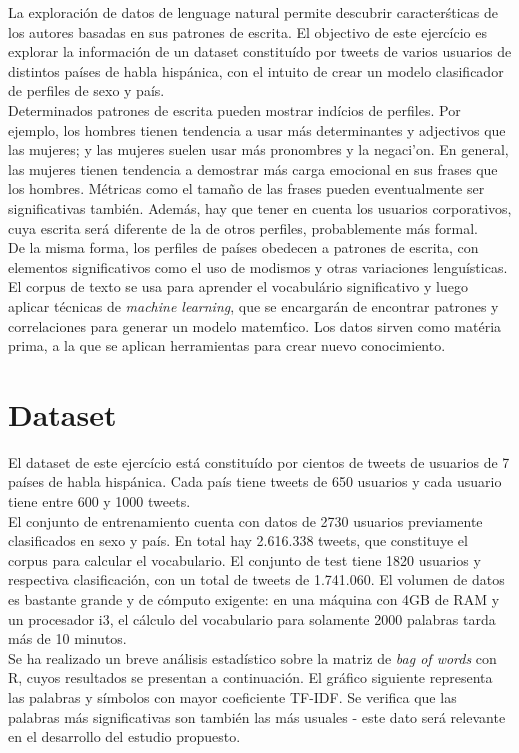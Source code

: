 \documentclass[11pt,a4paper]{article}
\begin{document}
  \indent La exploraci\'on de datos de lenguage natural permite descubrir caracter\'sticas de los autores basadas en sus patrones de escrita. El objectivo de este ejerc\'icio es explorar la informaci\'on de un dataset constitu\'ido por tweets de varios usuarios de distintos pa\'ises de habla hisp\'anica, con el intuito de crear un modelo clasificador de perfiles de sexo y pa\'is.\\
  \indent Determinados patrones de escrita pueden mostrar ind\'icios de perfiles. Por ejemplo, los hombres tienen tendencia a usar m\'as determinantes y adjectivos que las mujeres; y las mujeres suelen usar m\'as pronombres y la negaci'on. En general, las mujeres tienen tendencia a demostrar m\'as carga emocional en sus frases que los hombres. M\'etricas como el tamaño de las frases pueden eventualmente ser significativas tambi\'en. Adem\'as, hay que tener en cuenta los usuarios corporativos, cuya escrita ser\'a diferente de la de otros perfiles, probablemente m\'as formal.\\
  \indent De la misma forma, los perfiles de pa\'ises obedecen a patrones de escrita, con elementos significativos como el uso de modismos y otras variaciones lengu\'isticas. \\
  \indent El corpus de texto se usa para aprender el vocabul\'ario significativo y luego aplicar t\'ecnicas de {\em machine learning}, que se encargar\'an de encontrar patrones y correlaciones para generar un modelo matem\'tico. Los datos sirven como mat\'eria prima, a la que se aplican herramientas para crear nuevo conocimiento.


\section{Dataset}

  \indent El dataset de este ejerc\'icio est\'a constitu\'ido por cientos de tweets de usuarios de 7 pa\'ises de habla hisp\'anica. Cada pa\'is tiene tweets de 650 usuarios y cada usuario tiene entre 600 y 1000 tweets. \\
  \indent El conjunto de entrenamiento cuenta con datos de 2730 usuarios previamente clasificados en sexo y pa\'is. En total hay 2.616.338 tweets, que constituye el corpus para calcular el vocabulario. El conjunto de test tiene 1820 usuarios y respectiva clasificaci\'on, con un total de tweets de 1.741.060. El volumen de datos es bastante grande y de c\'omputo exigente: en una m\'aquina con 4GB de RAM y un procesador i3, el c\'alculo del vocabulario para solamente 2000 palabras tarda m\'as de 10 minutos.\\  
  \indent Se ha realizado un breve an\'alisis estad\'istico sobre la matriz de {\em bag of words} con R, cuyos resultados se presentan a continuaci\'on. El gr\'afico siguiente representa las palabras y s\'imbolos con mayor coeficiente TF-IDF. Se verifica que las palabras m\'as significativas son tambi\'en las m\'as usuales - este dato ser\'a relevante en el desarrollo del estudio propuesto.
  
\end{document}
